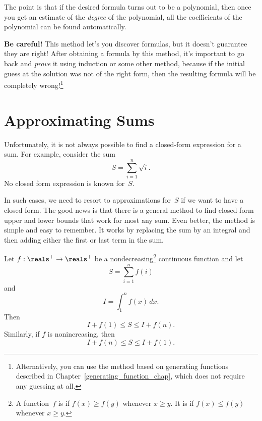 The point is that if the desired formula turns out to be a polynomial,
then once you get an estimate of the \emph{degree} of the polynomial,
all the coefficients of the polynomial can be found automatically.

\textbf{Be careful!}  This method let's you discover formulas, but it
doesn't guarantee they are right!  After obtaining a formula by this
method, it's important to go back and \emph{prove} it using induction
or some other method, because if the initial guess at the solution was
not of the right form, then the resulting formula will be completely
wrong!\footnote{Alternatively, you can use the method based on
  generating functions described in
  Chapter~\ref{generating_function_chap}, which does not require any
  guessing at all.}

\section{Approximating Sums}

Unfortunately, it is not always possible to find a closed-form
expression for a sum.  For example, consider the sum
\begin{equation*}
    S = \sum_{i = 1}^n \sqrt{i}.
\end{equation*}
No closed form expression is known for~$S$.

In such cases, we need to resort to approximations for~$S$ if we want
to have a closed form.  The good news is that there is a general
method to find closed-form upper and lower bounds that work for most
any sum.  Even better, the method is simple and easy to remember.  It
works by replacing the sum by an integral and then adding either the
first or last term in the sum.

\begin{theorem}\label{thm:9G3}
Let $f: \reals^+ \to \reals^+$ be a nondecreasing\footnote{A
  function~$f$ is  if $f(x) \ge f(y)$ whenever $x
  \ge y$.  It is  if $f(x) \le f(y)$ whenever $x
  \ge y$.} continuous function and let
\begin{equation*}
    S = \sum_{i = 1}^n f(i)
\end{equation*}
and
\begin{equation*}
    I = \int_1^n f(x)\, dx.
\end{equation*}
Then
\begin{equation*}
    I + f(1) \le S \le I + f(n).
\end{equation*}
Similarly, if $f$ is nonincreasing, then
\begin{equation*}
    I + f(n) \le S \le I + f(1).
\end{equation*}
\end{theorem}

